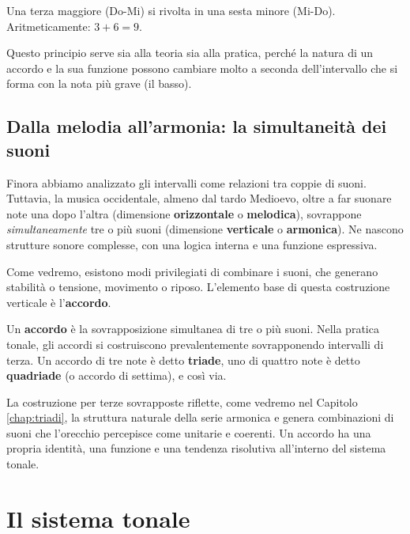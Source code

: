 \begin{esempio}
	\label{ex:inversione_intervallo}
	Una terza maggiore (Do-Mi) si rivolta in una sesta minore (Mi-Do). Aritmeticamente: $3+6=9$.
\end{esempio}

Questo principio serve sia alla teoria sia alla pratica, perché la natura di un accordo e la sua funzione possono cambiare molto a seconda dell'intervallo che si forma con la nota più grave (il basso).

\subsection{Dalla melodia all'armonia: la simultaneità dei suoni}

Finora abbiamo analizzato gli intervalli come relazioni tra coppie di suoni. Tuttavia, la musica occidentale, almeno dal tardo Medioevo, oltre a far suonare note una dopo l'altra (dimensione \textbf{orizzontale} o \textbf{melodica}), sovrappone \textit{simultaneamente} tre o più suoni (dimensione \textbf{verticale} o \textbf{armonica}). Ne nascono strutture sonore complesse, con una logica interna e una funzione espressiva.

Come vedremo, esistono modi privilegiati di combinare i suoni, che generano stabilità o tensione, movimento o riposo. L'elemento base di questa costruzione verticale è l'\textbf{accordo}.


\begin{definizione}[Accordo]
	\label{def:accordo}
	Un \textbf{accordo} è la sovrapposizione simultanea di tre o più suoni. Nella pratica tonale, gli accordi si costruiscono prevalentemente sovrapponendo intervalli di terza. Un accordo di tre note è detto \textbf{triade}, uno di quattro note è detto \textbf{quadriade} (o accordo di settima), e così via.
\end{definizione}

La costruzione per terze sovrapposte riflette, come vedremo nel Capitolo \ref{chap:triadi}, la struttura naturale della serie armonica e genera combinazioni di suoni che l'orecchio percepisce come unitarie e coerenti. Un accordo ha una propria identità, una funzione e una tendenza risolutiva all'interno del sistema tonale.

\section{Il sistema tonale}
\label{sec:sistema_tonale}

